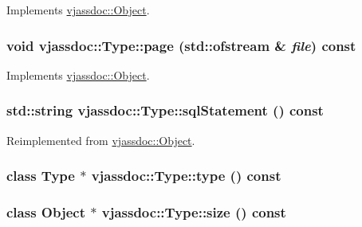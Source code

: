 Implements \hyperlink{classvjassdoc_1_1Object_736bbb6719edd8070d8f56c364a2764c}{vjassdoc::Object}.\hypertarget{classvjassdoc_1_1Type_aa7a3044fc74587aa8800b1d67b18930}{
\subsubsection{\setlength{\rightskip}{0pt plus 5cm}void vjassdoc::Type::page (std::ofstream \& {\em file}) const}}
\label{classvjassdoc_1_1Type_aa7a3044fc74587aa8800b1d67b18930}




Implements \hyperlink{classvjassdoc_1_1Object_a0489e38956f3507566b1bc6e3e2c8af}{vjassdoc::Object}.\hypertarget{classvjassdoc_1_1Type_22741189ccde7fa7bc63abdeaf256c92}{
\subsubsection{\setlength{\rightskip}{0pt plus 5cm}std::string vjassdoc::Type::sqlStatement () const}}
\label{classvjassdoc_1_1Type_22741189ccde7fa7bc63abdeaf256c92}




Reimplemented from \hyperlink{classvjassdoc_1_1Object_4e8ebbb0ce5b0bf91ec847b1e4a9f8fc}{vjassdoc::Object}.\hypertarget{classvjassdoc_1_1Type_e0527e578a64a9f6be29176281397397}{
\subsubsection{\setlength{\rightskip}{0pt plus 5cm}class {\bf Type} $\ast$ vjassdoc::Type::type () const}}
\label{classvjassdoc_1_1Type_e0527e578a64a9f6be29176281397397}


\hypertarget{classvjassdoc_1_1Type_93ddef89deb764de56905c9c78074c6f}{
\subsubsection{\setlength{\rightskip}{0pt plus 5cm}class {\bf Object} $\ast$ vjassdoc::Type::size () const}}
\label{classvjassdoc_1_1Type_93ddef89deb764de56905c9c78074c6f}


